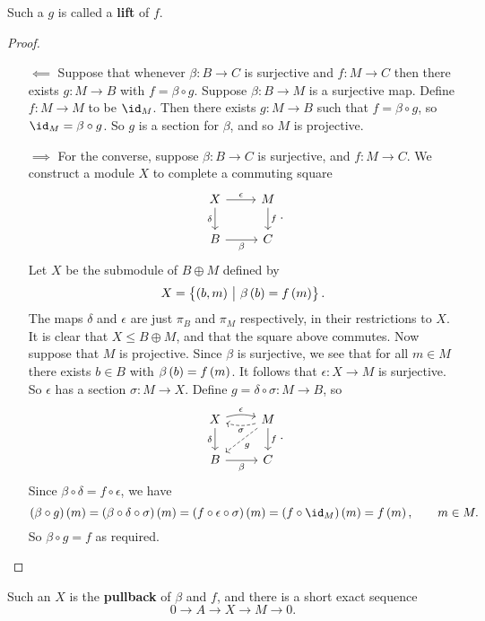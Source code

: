Such a $ g $ is called a \textbf{lift} of $ f $.

\begin{proof}
\hfill
\begin{itemize}
\item[$ \impliedby $] Suppose that whenever $ \beta : B \to C $ is surjective and $ f : M \to C $ then there exists $ g : M \to B $ with $ f = \beta \circ g $. Suppose $ \beta : B \to M $ is a surjective map. Define $ f : M \to M $ to be $ \id_M $. Then there exists $ g : M \to B $ such that $ f = \beta \circ g $, so $ \id_M = \beta \circ g $. So $ g $ is a section for $ \beta $, and so $ M $ is projective.
\item[$ \implies $] For the converse, suppose $ \beta : B \to C $ is surjective, and $ f : M \to C $. We construct a module $ X $ to complete a commuting square
$$
\begin{tikzcd}
X \arrow{r}{\epsilon} \arrow{d}[swap]{\delta} & M \arrow{d}{f} \\
B \arrow{r}[swap]{\beta} & C
\end{tikzcd}.
$$
Let $ X $ be the submodule of $ B \oplus M $ defined by
$$ X = \cbr{\br{b, m} \st \beta\br{b} = f\br{m}}. $$
The maps $ \delta $ and $ \epsilon $ are just $ \pi_B $ and $ \pi_M $ respectively, in their restrictions to $ X $. It is clear that $ X \le B \oplus M $, and that the square above commutes. Now suppose that $ M $ is projective. Since $ \beta $ is surjective, we see that for all $ m \in M $ there exists $ b \in B $ with $ \beta\br{b} = f\br{m} $. It follows that $ \epsilon : X \to M $ is surjective. So $ \epsilon $ has a section $ \sigma : M \to X $. Define $ g = \delta \circ \sigma : M \to B $, so
$$
\begin{tikzcd}
X \arrow[bend left=15]{r}{\epsilon} \arrow{d}[swap]{\delta} & M \arrow[bend left=15, dashed]{l}{\sigma} \arrow[dashed]{dl}{g} \arrow{d}{f} \\
B \arrow{r}[swap]{\beta} & C
\end{tikzcd}.
$$
Since $ \beta \circ \delta = f \circ \epsilon $, we have
$$ \br{\beta \circ g}\br{m} = \br{\beta \circ \delta \circ \sigma}\br{m} = \br{f \circ \epsilon \circ \sigma}\br{m} = \br{f \circ \id_M}\br{m} = f\br{m}, \qquad m \in M. $$
So $ \beta \circ g = f $ as required.
\end{itemize}
\end{proof}

\pagebreak

Such an $ X $ is the \textbf{pullback} of $ \beta $ and $ f $, and there is a short exact sequence
$$ 0 \to A \to X \to M \to 0. $$

